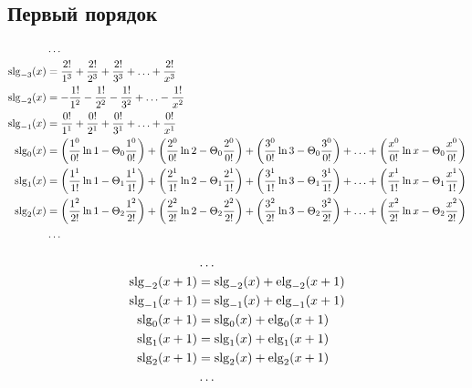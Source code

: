 \subsection{Первый порядок}

\begin{equation*} \begin{aligned}
&\ldots
\\
\operatorname{slg}_{-3}(x) &=
  \frac{2!}{1^3}
+ \frac{2!}{2^3} 
+ \frac{2!}{3^3} 
+ \ldots 
+ \frac{2!}{x^3}
\\
\operatorname{slg}_{-2}(x) &=
- \frac{1!}{1^2}
- \frac{1!}{2^2} 
- \frac{1!}{3^2} 
+ \ldots 
- \frac{1!}{x^2}
\\
\operatorname{slg}_{-1}(x) &=
  \frac{0!}{1^1}
+ \frac{0!}{2^1} 
+ \frac{0!}{3^1} 
+ \ldots 
+ \frac{0!}{x^1}
\\
\operatorname{slg}_0(x) &=
  \left( \frac{1^0}{0!} \ln{1} - \Theta_0 \frac{1^0}{0!} \right)
+ \left( \frac{2^0}{0!} \ln{2} - \Theta_0 \frac{2^0}{0!} \right) 
+ \left( \frac{3^0}{0!} \ln{3} - \Theta_0 \frac{3^0}{0!} \right) 
+ \ldots 
+ \left( \frac{x^0}{0!} \ln{x} - \Theta_0 \frac{x^0}{0!} \right)
\\
\operatorname{slg}_1(x) &=
  \left(\frac{1^1}{1!} \ln{1} - \Theta_1 \frac{1^1}{1!} \right)
+ \left( \frac{2^1}{1!} \ln{2} - \Theta_1 \frac{2^1}{1!} \right) 
+ \left( \frac{3^1}{1!} \ln{3} - \Theta_1 \frac{3^1}{1!} \right) 
+ \ldots 
+ \left( \frac{x^1}{1!} \ln{x} - \Theta_1 \frac{x^1}{1!} \right)
\\
\operatorname{slg}_2(x) &=
  \left( \frac{1^2}{2!} \ln{1} - \Theta_2 \frac{1^2}{2!} \right)
+ \left( \frac{2^2}{2!} \ln{2} - \Theta_2 \frac{2^2}{2!} \right) 
+ \left( \frac{3^2}{2!} \ln{3} - \Theta_2 \frac{3^2}{2!} \right) 
+ \ldots 
+ \left( \frac{x^2}{2!} \ln{x} - \Theta_2 \frac{x^2}{2!} \right)
\\
&\ldots
\\
\end{aligned} \end{equation*}

\begin{equation*} \begin{aligned}
&\ldots
\\
\operatorname{slg}_{-2}(x + 1) &= 
  \operatorname{slg}_{-2}(x) + \operatorname{elg}_{-2}(x + 1)
\\
\operatorname{slg}_{-1}(x + 1) &= 
  \operatorname{slg}_{-1}(x) + \operatorname{elg}_{-1}(x + 1)
\\
\operatorname{slg}_0(x + 1) &= 
  \operatorname{slg}_0(x) + \operatorname{elg}_0(x + 1)
\\
\operatorname{slg}_1(x + 1) &= 
  \operatorname{slg}_1(x) + \operatorname{elg}_1(x + 1)  
\\
\operatorname{slg}_2(x + 1) &= 
  \operatorname{slg}_2(x) + \operatorname{elg}_2(x + 1)
\\
&\ldots
\\
\end{aligned} \end{equation*}

